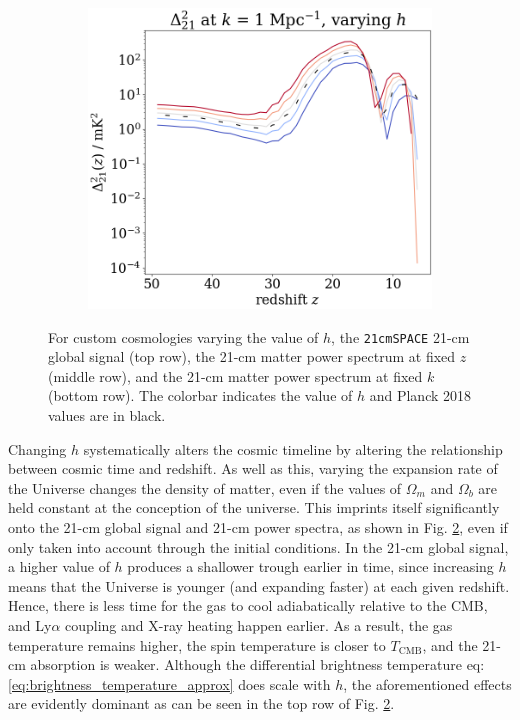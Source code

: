 \documentclass[floats,floatfix,showpacs,amssymb,prd,superscriptaddress,nofootinbib, 11pt]{revtex4-2} %
\newcommand{\code}{\texttt}
\begin{document}
\begin{figure}[H]
\begin{subfigure}[b]{0.45\textwidth}
     \end{subfigure}
     \hfill
     \begin{subfigure}[b]{0.45\textwidth}
         \centering
         \includegraphics[width=\textwidth]{images/simulation_results/power_spectrum_fixed_k_1_h.png}
         \label{fig:power_spectrum_fixed_k_1_h}
     \end{subfigure}
        \caption{For custom cosmologies varying the value of $h$, the \code{21cmSPACE} 21-cm global signal (top row), the 21-cm matter power spectrum at fixed $z$ (middle row), and the 21-cm matter power spectrum at fixed $k$ (bottom row). The colorbar indicates the value of $h$ and Planck 2018 values are in black.}
        \label{fig:simulation_results_h}
\end{figure}

Changing $h$ systematically alters the cosmic timeline by altering the relationship between cosmic time and redshift. As well as this, varying the expansion rate of the Universe changes the density of matter, even if the values of $\Omega_m$ and $\Omega_b$ are held constant at the conception of the universe. This imprints itself significantly onto the 21-cm global signal and 21-cm power spectra, as shown in Fig. \ref{fig:simulation_results_h}, even if only taken into account through the initial conditions. In the 21-cm global signal, a higher value of $h$ produces a shallower trough earlier in time, since increasing $h$ means that the Universe is younger (and expanding faster) at each given redshift. Hence, there is less time for the gas to cool adiabatically relative to the CMB, and Ly$\alpha$ coupling and X-ray heating happen earlier. As a result, the gas temperature remains higher, the spin temperature is closer to $T_{\text{CMB}}$, and the 21-cm absorption is weaker. Although the differential brightness temperature eq: \ref{eq:brightness_temperature_approx} does scale with $h$, the aforementioned effects are evidently dominant as can be seen in the top row of Fig. \ref{fig:simulation_results_h}. 
\end{document}
